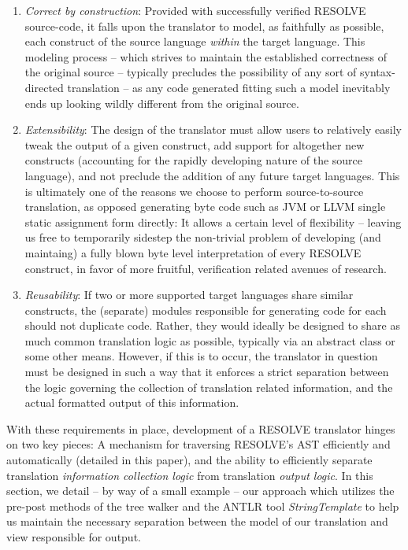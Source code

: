 \documentclass[times]{speauth}
\begin{document}
\begin{enumerate}
\item \textit{Correct by construction}: Provided with successfully verified RESOLVE source-code, it falls upon the translator to model, as faithfully as possible, each construct of the source language \textit{within} the target language. This modeling process -- which strives to maintain the established correctness of the original source -- typically precludes the possibility of any sort of syntax-directed translation -- as any code generated fitting such a model inevitably ends up looking wildly different from the original source.
\item \textit{Extensibility}: The design of the translator must allow users to relatively easily tweak the output of a given construct, add support for altogether new constructs (accounting for the rapidly developing nature of the source language), and not preclude the addition of any future target languages. This is ultimately one of the reasons we choose to perform source-to-source translation, as opposed generating byte code such as JVM or LLVM single static assignment form directly: It allows a certain level of flexibility -- leaving us free to temporarily sidestep the non-trivial problem of developing (and maintaing) a fully blown byte level interpretation of every RESOLVE construct, in favor of more fruitful, verification related avenues of research.
\item \textit{Reusability}: If two or more supported target languages share similar constructs, the (separate) modules responsible for generating code for each should not duplicate code. Rather, they would ideally be designed to share as much common translation logic as possible, typically via an abstract class or some other means. However, if this is to occur, the translator in question must be designed in such a way that it enforces a strict separation between the logic governing the collection of translation related information, and the actual formatted output of this information.
\end{enumerate}

With these requirements in place, development of a RESOLVE translator hinges on two key pieces: A mechanism for traversing RESOLVE's AST efficiently and automatically (detailed in this paper), and the ability to efficiently separate translation \textit{information collection logic} from translation \textit{output logic}. In this section, we detail -- by way of a small example -- our approach which utilizes the pre-post methods of the tree walker and the ANTLR tool \textit{StringTemplate} to help us maintain the necessary separation between the model of our translation and view responsible for output.
\end{document}
